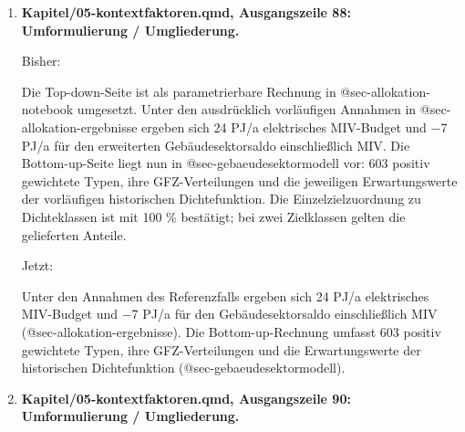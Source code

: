 \documentclass[
  ngerman,
  a4paper,
  DIV=11]{scrreprt}
\newenvironment{Shaded}{\begin{snugshade}}{\end{snugshade}}
\newcommand{\NormalTok}[1]{\textcolor[rgb]{0.00,0.23,0.31}{#1}}
\begin{document}
\begin{enumerate}
  Bisher:

\begin{Shaded}
\begin{Highlighting}[]
\NormalTok{\#\# Kalibrierergebnis und Qualitätssicherung}
\end{Highlighting}
\end{Shaded}

  Jetzt:

\begin{Shaded}
\begin{Highlighting}[]
\NormalTok{\#\# Kalibrierungsstand und Ergebnisvergleich}
\end{Highlighting}
\end{Shaded}
\item
  \textbf{Kapitel/05-kontextfaktoren.qmd, Ausgangszeile 88:
  Umformulierung / Umgliederung.}

  Bisher:

\begin{Shaded}
\begin{Highlighting}[]
\NormalTok{Die Top{-}down{-}Seite ist als parametrierbare Rechnung in @sec{-}allokation{-}notebook umgesetzt. Unter den ausdrücklich vorläufigen Annahmen in @sec{-}allokation{-}ergebnisse ergeben sich 24 PJ/a elektrisches MIV{-}Budget und −7 PJ/a für den erweiterten Gebäudesektorsaldo einschließlich MIV. Die Bottom{-}up{-}Seite liegt nun in @sec{-}gebaeudesektormodell vor: 603 positiv gewichtete Typen, ihre GFZ{-}Verteilungen und die jeweiligen Erwartungswerte der vorläufigen historischen Dichtefunktion. Die Einzelzielzuordnung zu Dichteklassen ist mit 100 \% bestätigt; bei zwei Zielklassen gelten die gelieferten Anteile.}
\end{Highlighting}
\end{Shaded}

  Jetzt:

\begin{Shaded}
\begin{Highlighting}[]
\NormalTok{Unter den Annahmen des Referenzfalls ergeben sich 24 PJ/a elektrisches MIV{-}Budget und −7 PJ/a für den Gebäudesektorsaldo einschließlich MIV (@sec{-}allokation{-}ergebnisse). Die Bottom{-}up{-}Rechnung umfasst 603 positiv gewichtete Typen, ihre GFZ{-}Verteilungen und die Erwartungswerte der historischen Dichtefunktion (@sec{-}gebaeudesektormodell).}
\end{Highlighting}
\end{Shaded}
\item
  \textbf{Kapitel/05-kontextfaktoren.qmd, Ausgangszeile 90:
  Umformulierung / Umgliederung.}


\end{enumerate}
\end{document}
